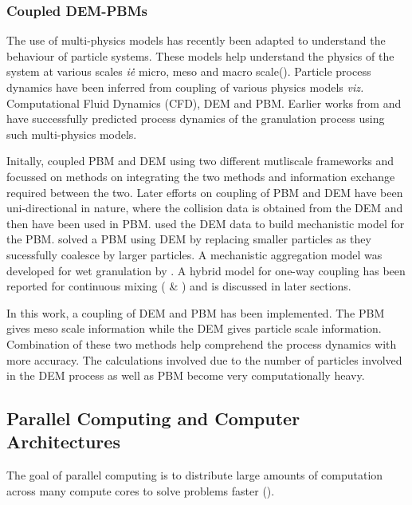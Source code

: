\documentclass[preprint,11pt,authoryear]{elsarticle}
\begin{document}
\subsubsection{Coupled DEM-PBMs}
\par The use of multi-physics models has recently been adapted to understand the behaviour of 
particle systems. These models help understand the physics of the system at various scales 
\textit{i\.e\.} micro, meso and macro scale(\cite{sen2014}). Particle process dynamics have been 
inferred from coupling of various physics models \textit{viz.} Computational Fluid Dynamics (CFD), 
DEM and PBM. Earlier works from \cite{sen2014} and \cite{Barrasso2015cerd} have successfully 
predicted process dynamics of the granulation process using such multi-physics models.
\par Initally, \cite{ingram2005} coupled PBM and DEM using two different mutliscale frameworks and 
focussed on methods on integrating the two methods and information exchange required between the 
two. Later efforts on coupling of PBM and DEM have been uni-directional in nature, where the collision 
data is obtained from the DEM and then have been used in PBM. \cite{gantt2006} used the DEM data 
to build mechanistic model for the PBM. \cite{Goldschmidt2003} solved a PBM using DEM by 
replacing smaller particles as they sucessfully coalesce by larger particles. A mechanistic aggregation 
model was developed for wet granulation by \cite{Reinhold2012}. A hybrid model for one-way coupling 
has been reported for continuous mixing (\cite{sen2013} \& \cite{sen2013b}) and is discussed in later 
sections.
\par In this work, a coupling of DEM and PBM has been implemented. The PBM gives meso scale 
information while the DEM gives particle scale information. Combination of these two methods help 
comprehend the process dynamics with more accuracy. The calculations involved due to the number 
of particles involved in the DEM process as well as PBM become very computationally heavy. %


\subsection{Parallel Computing and Computer Architectures}
\par The goal of parallel computing is to distribute large amounts of computation across many 
compute cores to solve problems faster (\cite{wilkinson2005}).
\end{document}
